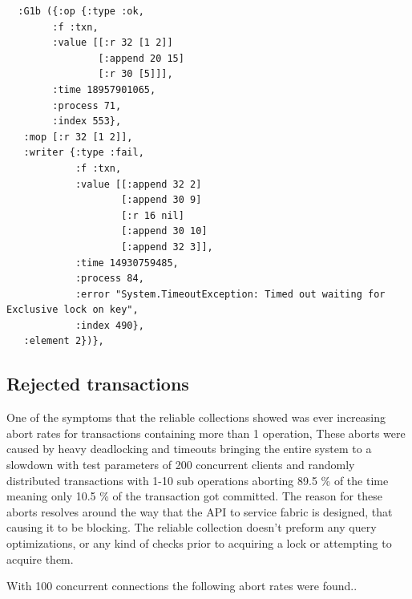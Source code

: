 \documentclass[a4paper,10pt,titlepage]{report}
\begin{document}
\begin{lstlisting}
  :G1b ({:op {:type :ok,
        :f :txn,
        :value [[:r 32 [1 2]] 
                [:append 20 15] 
                [:r 30 [5]]],
        :time 18957901065,
        :process 71,
        :index 553},
   :mop [:r 32 [1 2]],
   :writer {:type :fail,
            :f :txn,
            :value [[:append 32 2] 
                    [:append 30 9] 
                    [:r 16 nil] 
                    [:append 30 10] 
                    [:append 32 3]],
            :time 14930759485,
            :process 84,
            :error "System.TimeoutException: Timed out waiting for Exclusive lock on key",
            :index 490},
   :element 2})},
\end{lstlisting}

\newpage
\subsection{Rejected transactions}

One of the symptoms that the reliable collections showed was ever increasing abort rates for transactions containing more than 1 operation, These aborts were caused by heavy deadlocking and timeouts bringing the entire system to a slowdown with test parameters of 200 concurrent clients and randomly distributed transactions with 1-10 sub operations aborting 89.5 \% of the time meaning only 10.5 \% of the transaction got committed. The reason for these aborts resolves around the way that the API to service fabric is designed, that causing it to be blocking. The reliable collection doesn't preform any query optimizations, or any kind of checks prior to acquiring a lock or attempting to acquire them. 

With 100 concurrent connections the following abort rates were found.. 


\newpage                      
\end{document}
